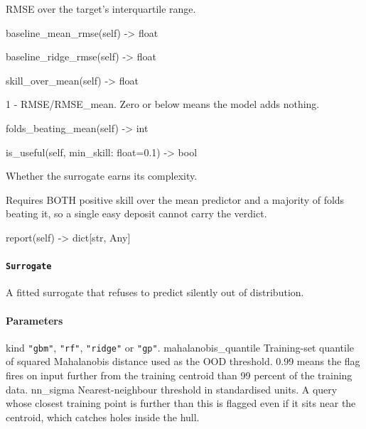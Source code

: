 \documentclass[10pt,a4paper,twoside]{report}
\begin{document}
RMSE over the target's interquartile range.

\begin{verbatimsmall}
baseline_mean_rmse(self) -> float
\end{verbatimsmall}

\begin{verbatimsmall}
baseline_ridge_rmse(self) -> float
\end{verbatimsmall}

\begin{verbatimsmall}
skill_over_mean(self) -> float
\end{verbatimsmall}

1 - RMSE/RMSE\_mean. Zero or below means the model adds nothing.

\begin{verbatimsmall}
folds_beating_mean(self) -> int
\end{verbatimsmall}

\begin{verbatimsmall}
is_useful(self, min_skill: float=0.1) -> bool
\end{verbatimsmall}

Whether the surrogate earns its complexity.

Requires BOTH positive skill over the mean predictor and a majority of folds beating it, so a single easy deposit cannot carry the verdict.

\begin{verbatimsmall}
report(self) -> dict[str, Any]
\end{verbatimsmall}

\paragraph{\texttt{Surrogate}}

A fitted surrogate that refuses to predict silently out of distribution.

\paragraph*{Parameters}

kind \texttt{"gbm"}, \texttt{"rf"}, \texttt{"ridge"} or \texttt{"gp"}. mahalanobis\_quantile Training-set quantile of squared Mahalanobis distance used as the OOD threshold. 0.99 means the flag fires on input further from the training centroid than 99 percent of the training data. nn\_sigma Nearest-neighbour threshold in standardised units. A query whose closest training point is further than this is flagged even if it sits near the centroid, which catches holes inside the hull.
\end{document}
